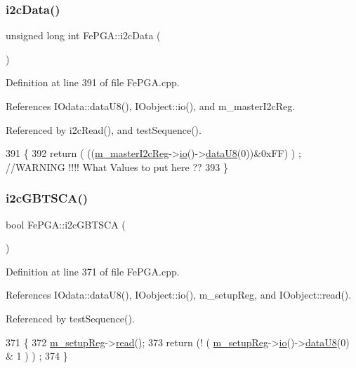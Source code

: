 \subsubsection{\texorpdfstring{i2c\+Data()}{i2cData()}}
{\footnotesize\ttfamily unsigned long int Fe\+P\+G\+A\+::i2c\+Data (\begin{DoxyParamCaption}{ }\end{DoxyParamCaption})}



Definition at line 391 of file Fe\+P\+G\+A.\+cpp.



References I\+Odata\+::data\+U8(), I\+Oobject\+::io(), and m\+\_\+master\+I2c\+Reg.



Referenced by i2c\+Read(), and test\+Sequence().


\begin{DoxyCode}
391                                 \{
392   \textcolor{keywordflow}{return} ( ((\hyperlink{classFePGA_adb390ea8de4a6cbce648dc62e4405f32}{m\_masterI2cReg}->\hyperlink{classIOobject_af04fb94137c3d86849f478ac5afab5d1}{io}()->\hyperlink{classIOdata_a75e9c318dbac3a39402179070943d4bc}{dataU8}(0))&0xFF) ) ; \textcolor{comment}{//WARNING !!!! What Values to
       put here ??}
393 \}
\end{DoxyCode}
\mbox{\label{classFePGA_a210cf57766c4f818ea61af671e91cfeb}} 
\subsubsection{\texorpdfstring{i2c\+G\+B\+T\+S\+C\+A()}{i2cGBTSCA()}}
{\footnotesize\ttfamily bool Fe\+P\+G\+A\+::i2c\+G\+B\+T\+S\+CA (\begin{DoxyParamCaption}{ }\end{DoxyParamCaption})}



Definition at line 371 of file Fe\+P\+G\+A.\+cpp.



References I\+Odata\+::data\+U8(), I\+Oobject\+::io(), m\+\_\+setup\+Reg, and I\+Oobject\+::read().



Referenced by test\+Sequence().


\begin{DoxyCode}
371                       \{
372   \hyperlink{classFePGA_a0255fe229013986b4387c3a75ddf4e97}{m\_setupReg}->\hyperlink{classIOobject_aa07610c11963b1db6710e3c76ceea456}{read}();
373   \textcolor{keywordflow}{return} (! ( \hyperlink{classFePGA_a0255fe229013986b4387c3a75ddf4e97}{m\_setupReg}->\hyperlink{classIOobject_af04fb94137c3d86849f478ac5afab5d1}{io}()->\hyperlink{classIOdata_a75e9c318dbac3a39402179070943d4bc}{dataU8}(0) & 1 ) ) ;
374 \}
\end{DoxyCode}
\mbox{\label{classFePGA_a939c5c23077210a2ad851a12694657a4}} 
